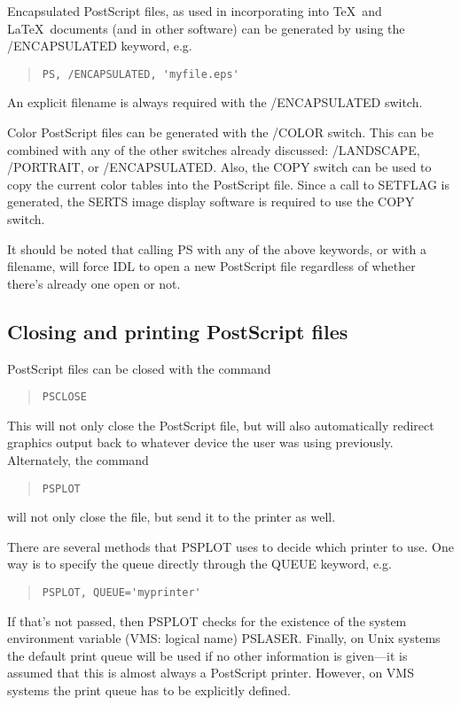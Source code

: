 Encapsulated PostScript files, as used in incorporating into \TeX\ and \LaTeX\
documents (and in other software) can be generated by using the /ENCAPSULATED
keyword, e.g.
\begin{quote}
\begin{verbatim}
PS, /ENCAPSULATED, 'myfile.eps'
\end{verbatim}
\end{quote}
An explicit filename is always required with the /ENCAPSULATED switch.

Color PostScript files can be generated with the /COLOR switch.  This can be
combined with any of the other switches already discussed: /LANDSCAPE,
/PORTRAIT, or /ENCAPSULATED.  Also, the COPY switch can be used to copy the
current color tables into the PostScript file.  Since a call to SETFLAG is
generated, the SERTS image display software is required to use the COPY switch.

It should be noted that calling PS with any of the above keywords, or with a
filename, will force IDL to open a new PostScript file regardless of whether
there's already one open or not.

\subsection{Closing and printing PostScript files}

PostScript files can be closed with the command
\begin{quote}
\begin{verbatim}
PSCLOSE
\end{verbatim}
\end{quote}
This will not only close the PostScript file, but will also automatically
redirect graphics output back to whatever device the user was using previously.
Alternately, the command
\begin{quote}
\begin{verbatim}
PSPLOT
\end{verbatim}
\end{quote}
will not only close the file, but send it to the printer as well.

There are several methods that PSPLOT uses to decide which printer to use.  One
way is to specify the queue directly through the QUEUE keyword, e.g.
\begin{quote}
\begin{verbatim}
PSPLOT, QUEUE='myprinter'
\end{verbatim}
\end{quote}
If that's not passed, then PSPLOT checks for the existence of the system
environment variable (VMS: logical name) PSLASER.  Finally, on Unix systems the
default print queue will be used if no other information is given---it is
assumed that this is almost always a PostScript printer.  However, on VMS
systems the print queue has to be explicitly defined.


